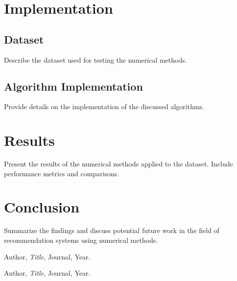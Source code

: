 \documentclass[12pt]{article}
\begin{document}
\section{Implementation}
\subsection{Dataset}
Describe the dataset used for testing the numerical methods.

\subsection{Algorithm Implementation}
Provide details on the implementation of the discussed algorithms.

\section{Results}
Present the results of the numerical methods applied to the dataset. Include performance metrics and comparisons.

\section{Conclusion}
Summarize the findings and discuss potential future work in the field of recommendation systems using numerical methods.

\begin{thebibliography}{9}
  Author, \textit{Title}, Journal, Year.
  
  Author, \textit{Title}, Journal, Year.
\end{thebibliography}
\end{document}

